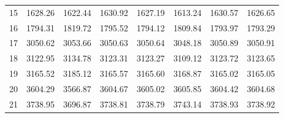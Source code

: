 \documentclass[10pt,oneside]{article}
\begin{document}
\begin{table}[h!]
\begin{tabular}{cccccccc}
15 &   1628.26 & 1622.44 & 1630.92 &    1627.19 &      1613.24 & 1630.57 &   1626.65 \\
16 &   1794.31 & 1819.72 & 1795.52 &    1794.12 &      1809.84 & 1793.97 &   1793.29 \\
17 &   3050.62 & 3053.66 & 3050.63 &    3050.64 &      3048.18 & 3050.89 &   3050.91 \\
18 &   3122.95 & 3134.78 & 3123.31 &    3123.27 &      3109.12 & 3123.72 &   3123.65 \\
19 &   3165.52 & 3185.12 & 3165.57 &    3165.60 &      3168.87 & 3165.02 &   3165.05 \\
20 &   3604.29 & 3566.87 & 3604.67 &    3605.02 &      3605.85 & 3604.42 &   3604.68 \\
21 &   3738.95 & 3696.87 & 3738.81 &    3738.79 &      3743.14 & 3738.93 &   3738.92 \\
\bottomrule
\end{tabular}
\end{table}
\end{document}
